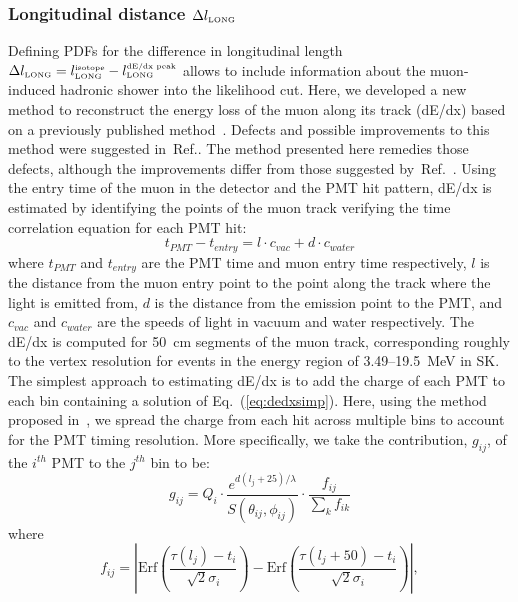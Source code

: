 \subsubsection{Longitudinal distance $\Delta l_{\mbox{\tiny LONG}}$}
Defining PDFs for the difference in longitudinal length $\Delta l_{\mbox{\tiny LONG}}=l_{\mbox{\tiny LONG}}^{\mbox{\tiny isotope}}-l_{\mbox{\tiny LONG}}^{\mbox{\tiny dE/dx peak}}$ allows to include information about the muon-induced hadronic shower into the likelihood cut. Here, we developed a new method to reconstruct the energy loss of the muon along its track (dE/dx) based on a previously published method~\cite{bib:sksrn123}. Defects and possible improvements to this method were suggested in~Ref.\cite{BLi_3}. The method presented here remedies those defects, although the improvements differ from those suggested by~Ref.~\cite{BLi_3}. Using the entry time of the muon in the detector and the PMT hit pattern, dE/dx is estimated by identifying the points of the muon track verifying the time correlation equation for each PMT hit:
\begin{equation}
t_{PMT} - t_{entry} = l\cdot c_{vac} + d \cdot c_{water} 
\label{eq:dedxsimp}
\end{equation}
where $t_{PMT}$ and $t_{entry}$ are the PMT time and muon entry time respectively, $l$ is the distance from the muon entry point to the point along the track where the light is emitted from, $d$ is the distance from the emission point to the PMT, and $c_{vac}$ and $c_{water}$ are the speeds of light in vacuum and water respectively. The dE/dx is computed for 50~cm segments of the muon track, corresponding roughly to the vertex resolution for events in the energy region of 3.49--19.5~MeV in SK. The simplest approach to estimating dE/dx is to add the charge of each PMT to each bin containing a solution of Eq.~(\ref{eq:dedxsimp}). Here, using the method proposed in~\cite{BLi_1}, we spread the charge from each hit across multiple bins to account for the PMT timing resolution. More specifically, we take the contribution, $g_{ij}$, of the $i^{th}$ PMT to the $j^{th}$ bin to be:
\begin{equation}
g_{ij} = Q_i \cdot \frac{e^{d(l_j + 25)/\lambda}}{S(\theta_{ij},\phi_{ij})} \cdot \frac{f_{ij}}{\sum_k f_{ik}}
\end{equation}
where
\begin{equation}
f_{ij} = \left|\mbox{Erf}\left(\frac{\tau(l_j) - t_i}{\sqrt{2}\sigma_i}\right)- \mbox{Erf}\left(\frac{\tau(l_j+50) - t_i}{\sqrt{2}\sigma_i}\right)\right|, 
\end{equation}
